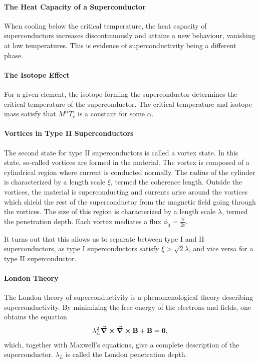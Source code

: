 \paragraph{The Heat Capacity of a Superconductor}
When cooling below the critical temperature, the heat capacity of superconductors increases discontinuously and attains a new behaviour, vanishing at low temperatures. This is evidence of superconductivity being a different phase.

\paragraph{The Isotope Effect}
For a given element, the isotope forming the superconductor determines the critical temperature of the superconductor. The critical temperature and isotope mass satisfy that $M^{\alpha}T_{\text{c}}$ is a constant for some $\alpha$.

\paragraph{Vortices in Type II Superconductors}
The second state for type II superconductors is called a vortex state. In this state, so-called vortices are formed in the material. The vortex is composed of a cylindrical region where current is conducted normally. The radius of the cylinder is characterized by a length scale $\xi$, termed the coherence length. Outside the vortices, the material is superconducting and currents arise around the vortices which shield the rest of the superconductor from the magnetic field going through the vortices. The size of this region is characterized by a length scale $\lambda$, termed the penetration depth. Each vortex mediates a flux $\phi_{0} = \frac{h}{2e}$.

It turns out that this allows us to separate between type I and II superconductors, as type I superconductors satisfy $\xi > \sqrt{2}\lambda$, and vice versa for a type II superconductor.

\paragraph{London Theory}
The London theory of superconductivity is a phenomenological theory describing superconductivity. By minimizing the free energy of the electrons and fields, one obtains the equation
\begin{align*}
	\lambda_{L}^{2}\curl{\curl{\vb{B}}} + \vb{B} = \vb{0},
\end{align*}
which, together with Maxwell's equations, give a complete description of the superconductor. $\lambda_{L}$ is called the London penetration depth.

